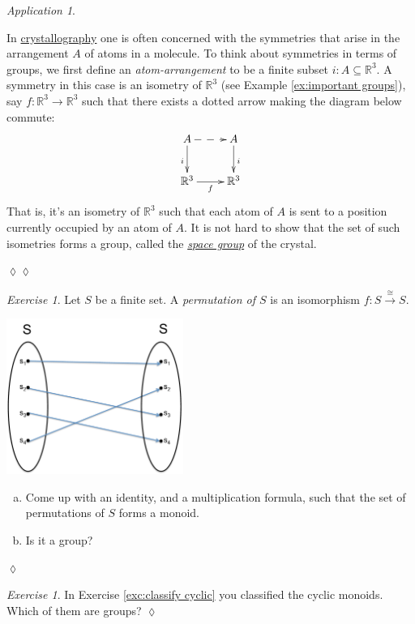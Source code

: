 \documentclass{book}
\def\RR{{\mathbb R}}
\def\to{\rightarrow}
\def\taking{\colon}
\def\ss{\subseteq}
\def\iso{\cong}
\newcommand{\To}[1]{\xrightarrow{#1}}
\theoremstyle{remark}
\newtheorem{exc}[subsubsection]{Exercise}
\newenvironment{exercise}{\begin{exc}}{\hspace*{\fill}$\lozenge$\end{exc}}
\newtheorem{app}[subsubsection]{Application}
\newenvironment{application}{\begin{app}}{\hspace*{\fill}$\lozenge\lozenge$\end{app}}
\theoremstyle{definition}
\def\sexc{\begin{enumerate}[a.)]\setlength{\itemsep}{.1cm}\setlength{\parskip}{.1cm}\item}
\def\next{\item}
\def\endsexc{\end{enumerate}}
\begin{document}
\begin{application}\label{app:groups for symmetry}

In \href{http://en.wikipedia.org/wiki/Crystallography}{\text crystallography} one is often concerned with the symmetries that arise in the arrangement $A$ of atoms in a molecule. To think about symmetries in terms of groups, we first define an {\em atom-arrangement} to be a finite subset $i\taking A\ss\RR^3$. A symmetry in this case is an isometry of $\RR^3$ (see Example \ref{ex:important groups}), say $f\taking\RR^3\to\RR^3$ such that there exists a dotted arrow making the diagram below commute:
$$
\xymatrix{A\ar@{-->}[r]\ar[d]_i&A\ar[d]^i\\\RR^3\ar[r]_f&\RR^3}
$$
That is, it's an isometry of $\RR^3$ such that each atom of $A$ is sent to a position currently occupied by an atom of $A$. It is not hard to show that the set of such isometries forms a group, called the \href{http://en.wikipedia.org/wiki/Space_group}{\em space group} of the crystal.

\end{application}

\begin{exercise}\label{exc:permutation}
Let $S$ be a finite set. A {\em permutation of $S$} is an isomorphism $f\taking S\To{\iso}S$. 
\begin{center}
\parbox{2.3in}{
\includegraphics[height=2in]{SetPermutation}}
\end{center}
\sexc Come up with an identity, and a  multiplication formula, such that the set of permutations of $S$ forms a monoid. 
\next Is it a group?
\endsexc
\end{exercise}

\begin{exercise}
In Exercise \ref{exc:classify cyclic} you classified the cyclic monoids. Which of them are groups? 
\end{exercise}
\end{document}
